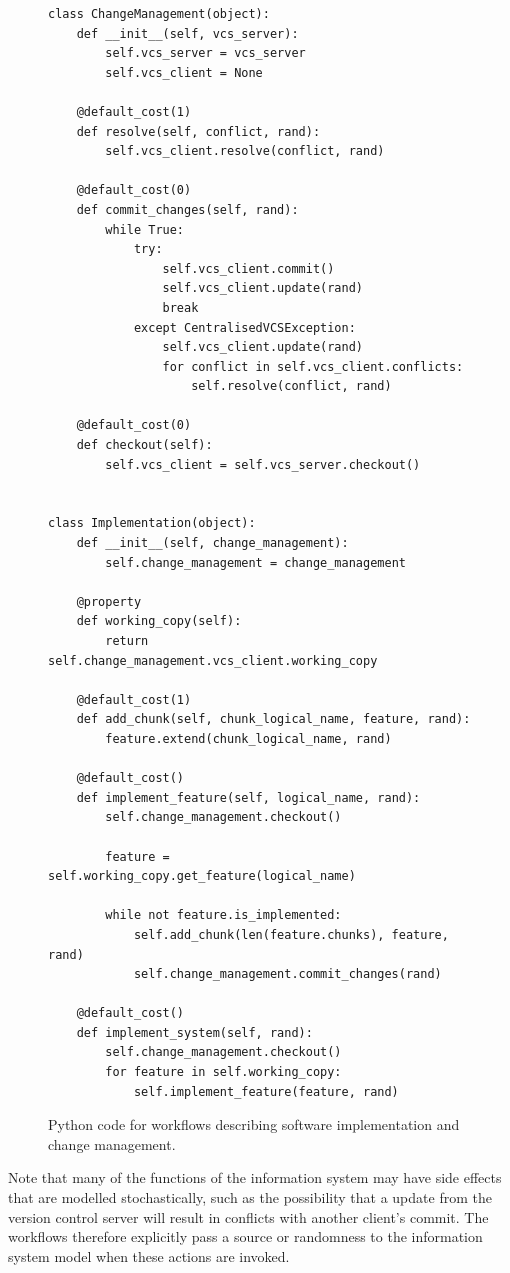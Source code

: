 \documentclass{llncs}
\begin{document}
\begin{figure}
  \centering
\begin{lstlisting}
class ChangeManagement(object):
    def __init__(self, vcs_server):
        self.vcs_server = vcs_server
        self.vcs_client = None

    @default_cost(1)
    def resolve(self, conflict, rand):
        self.vcs_client.resolve(conflict, rand)

    @default_cost(0)
    def commit_changes(self, rand):
        while True:
            try:
                self.vcs_client.commit()
                self.vcs_client.update(rand)
                break
            except CentralisedVCSException:
                self.vcs_client.update(rand)
                for conflict in self.vcs_client.conflicts:
                    self.resolve(conflict, rand)

    @default_cost(0)
    def checkout(self):
        self.vcs_client = self.vcs_server.checkout()


class Implementation(object):
    def __init__(self, change_management):
        self.change_management = change_management

    @property
    def working_copy(self):
        return self.change_management.vcs_client.working_copy

    @default_cost(1)
    def add_chunk(self, chunk_logical_name, feature, rand):
        feature.extend(chunk_logical_name, rand)

    @default_cost()
    def implement_feature(self, logical_name, rand):
        self.change_management.checkout()

        feature = self.working_copy.get_feature(logical_name)

        while not feature.is_implemented:
            self.add_chunk(len(feature.chunks), feature, rand)
            self.change_management.commit_changes(rand)

    @default_cost()
    def implement_system(self, rand):
        self.change_management.checkout()
        for feature in self.working_copy:
            self.implement_feature(feature, rand)

\end{lstlisting}
  \caption{Python code for workflows describing software implementation and change management.}
  \label{fig:workflows}

\end{figure}

Note that many of the functions of the information system may have side effects that are modelled stochastically, such
as the possibility that a update from the version control server will result in conflicts with another client's commit.
The workflows therefore explicitly pass a source or randomness to the information system model when these actions are
invoked.
\end{document}
